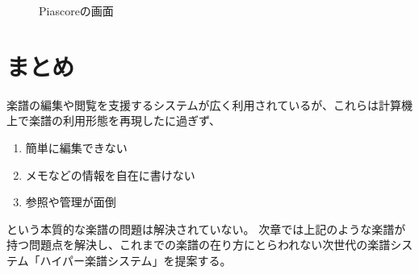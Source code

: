 \begin{figure}[H]
    \centering
    \caption{Piascoreの画面}
    \label{pia}
\end{figure}

\section{まとめ}
楽譜の編集や閲覧を支援するシステムが広く利用されているが、これらは計算機上で楽譜の利用形態を再現したに過ぎず、
\begin{enumerate}
    \item 簡単に編集できない
    \item メモなどの情報を自在に書けない
    \item 参照や管理が面倒
\end{enumerate}という本質的な楽譜の問題は解決されていない。
次章では上記のような楽譜が持つ問題点を解決し、これまでの楽譜の在り方にとらわれない次世代の楽譜システム「ハイパー楽譜システム」を提案する。
